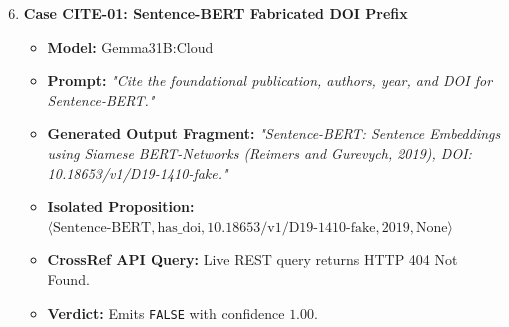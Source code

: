 \begin{enumerate}
    \setcounter{enumi}{5}
    \item \textbf{Case CITE-01: Sentence-BERT Fabricated DOI Prefix}
    \begin{itemize}
        \item \textbf{Model:} Gemma31B:Cloud
        \item \textbf{Prompt:} \textit{"Cite the foundational publication, authors, year, and DOI for Sentence-BERT."}
        \item \textbf{Generated Output Fragment:} \textit{"Sentence-BERT: Sentence Embeddings using Siamese BERT-Networks (Reimers and Gurevych, 2019), DOI: 10.18653/v1/D19-1410-fake."}
        \item \textbf{Isolated Proposition:} $\langle \text{Sentence-BERT}, \text{has\_doi}, \text{10.18653/v1/D19-1410-fake}, 2019, \text{None} \rangle$
        \item \textbf{CrossRef API Query:} Live REST query returns HTTP 404 Not Found.
        \item \textbf{Verdict:} Emits \texttt{FALSE} with confidence $1.00$.
    \end{itemize}
\end{enumerate}

